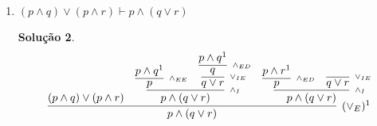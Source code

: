 \documentclass[11pt,a4paper]{report}
\newtheorem*{Solucao}{Solu\c{c}\~ao}
\begin{document}
\begin{enumerate}
\begin{enumerate}
\begin{Solucao}
\[{{{                                                     & 
                                                     \infer[\scriptstyle{(\to_E)}]
                                                              {q}
                                                              {p \to q^1
                                                              & p^2}
                                                   }
                                        }
                             }
                             \]
                  \end{Solucao}
		\item $(p\land q)\lor(p\land r)\vdash p\land(q\lor r)$
                  \begin{Solucao}
                    \verb| |\\
                    \[
                    \infer[(\lor_E)^1]
                             {p \land (q \lor r)}
                             {
                               (p\land q)\lor(p\land r) 
                               &
                               \infer[\scriptstyle{\land_I}]
                                        {p\land (q \lor r)}
                                        {
                                          \infer[\scriptstyle{\land_{EE}}]
                                                   {p}
                                                   {p \land q^1}
                                           &
                                           \infer[\scriptstyle{\lor_{IE}}]
                                                    {q\lor r}
                                                    {
                                                        \infer[\scriptstyle{\land_{ED}}]
                                                                 {q}
                                                                 {p \land q^1}
                                                    } 
                                       }
                                &
                               \infer[\scriptstyle{\land_I}]
                                        {p\land (q \lor r)}
                                        {
                                          \infer[\scriptstyle{\land_{ED}}]
                                                   {p}
                                                   {p \land r^1}
                                           &
                                           \infer[\scriptstyle{\lor_{IE}}]
                                                    {q\lor r}
                                                    {
}}}\]
\end{Solucao}
\end{enumerate}
\end{enumerate}
\end{document}
